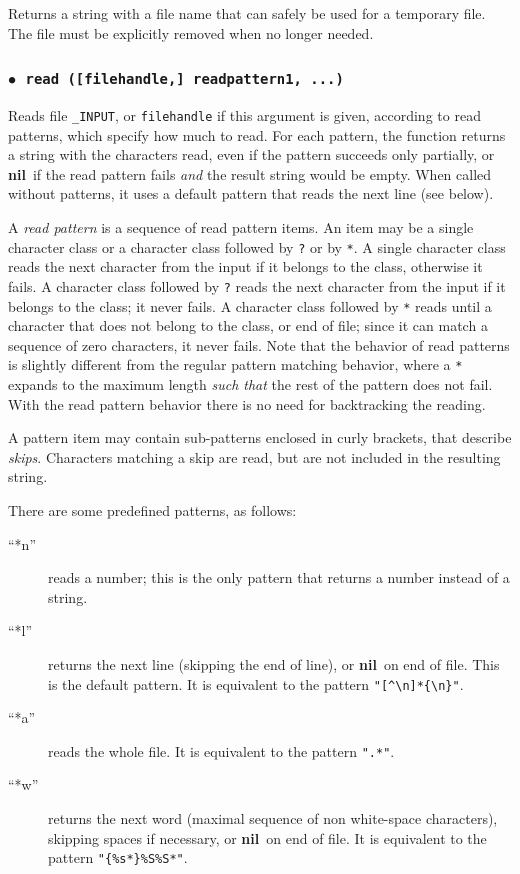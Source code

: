 \documentclass[11pt]{article}
\newcommand{\T}[1]{{\tt #1}}
\newcommand{\nil}{{\bf nil}}
\newcommand{\Def}[1]{\emph{#1}\index{#1}}
\newcommand{\Deffunc}[1]{\index{#1}}
\newcommand{\ff}{$\bullet$\ }
\begin{document}
Returns a string with a file name that can safely
be used for a temporary file.
The file must be explicitly removed when no longer needed.

\subsubsection*{\ff \T{read ([filehandle,] readpattern1, ...)}}\Deffunc{read}

Reads file \verb|_INPUT|,
or \verb|filehandle| if this argument is given,
according to read patterns, which specify how much to read.
For each pattern,
the function returns a string with the characters read,
even if the pattern succeeds only partially,
or \nil\ if the read pattern fails \emph{and}
the result string would be empty.
When called without patterns,
it uses a default pattern that reads the next line
(see below).

A \Def{read pattern} is a sequence of read pattern items.
An item may be a single character class
or a character class followed by \verb|?| or by \verb|*|.
A single character class reads the next character from the input
if it belongs to the class, otherwise it fails.
A character class followed by \verb|?| reads the next character
from the input if it belongs to the class;
it never fails.
A character class followed by \verb|*| reads until a character that
does not belong to the class, or end of file;
since it can match a sequence of zero characters, it never fails.
Note that the behavior of read patterns is slightly different from
the regular pattern matching behavior,
where a \verb|*| expands to the maximum length \emph{such that}
the rest of the pattern does not fail.
With the read pattern behavior
there is no need for backtracking the reading.

A pattern item may contain sub-patterns enclosed in curly brackets,
that describe \Def{skips}.
Characters matching a skip are read,
but are not included in the resulting string.

There are some predefined patterns, as follows:
\begin{description}
\item[``*n''] reads a number;
this is the only pattern that returns a number instead of a string.
\item[``*l''] returns the next line
(skipping the end of line), or \nil\ on end of file.
This is the default pattern.
It is equivalent to the pattern \verb|"[^\n]*{\n}"|.
\item[``*a''] reads the whole file.
It is equivalent to the pattern \verb|".*"|.
\item[``*w''] returns the next word
(maximal sequence of non white-space characters),
skipping spaces if necessary, or \nil\ on end of file.
It is equivalent to the pattern \verb|"{%s*}%S%S*"|.
\end{description}
\end{document}
